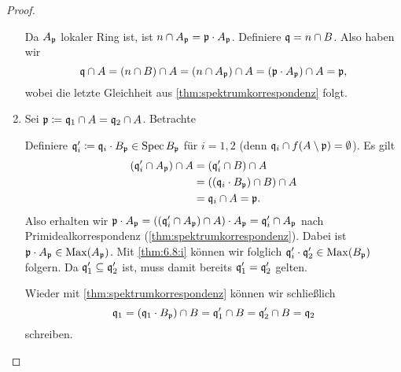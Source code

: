 \documentclass[12pt,a4paper]{scrartcl}
\theoremstyle{cplain}
\theoremstyle{cdef}
\begin{document}
\begin{proof}
\begin{enumerate}[label=\ref{thm:6.8:\roman*}]
		Da $A_{\mathfrak{p}}$ lokaler Ring ist, ist $n\cap A_{\mathfrak{p}} = \mathfrak{p}\cdot A_{\mathfrak{p}}$. Definiere $\mathfrak{q} = n\cap B$. Also haben wir 
		\[\mathfrak{q}\cap A = (n\cap B)\cap A = (n\cap A_{\mathfrak{p}})\cap A = (\mathfrak{p}\cdot A_{\mathfrak{p}})\cap A = \mathfrak{p},\]
		wobei die letzte Gleichheit aus \cref{thm:spektrumkorrespondenz} folgt.
		\item Sei $\mathfrak{p}\coloneqq \mathfrak{q}_1\cap A = \mathfrak{q}_2\cap A$. Betrachte
		\begin{center}
		\end{center}
		Definiere $\mathfrak{q}_i'\coloneqq \mathfrak{q}_i\cdot B_{\mathfrak{p}}\in \operatorname{Spec} B_{\mathfrak{p}}$ für $i = 1,2$ (denn $\mathfrak{q}_i\cap f(A\setminus \mathfrak{p}) = \emptyset$). Es gilt \begin{align*}(\mathfrak{q}_i'\cap A_{\mathfrak{p}})\cap A &= (\mathfrak{q}_i'\cap B) \cap A \\
									   &= ((\mathfrak{q}_i\cdot B_{\mathfrak{p}})\cap B)\cap A\\
									   &= \mathfrak{q}_i \cap A = \mathfrak{p}.
		\end{align*}
		Also erhalten wir $\mathfrak{p}\cdot A_{\mathfrak{p}} = ((\mathfrak{q}_i'\cap A_{\mathfrak{p}})\cap A)\cdot A_{\mathfrak{p}} = \mathfrak{q}_i'\cap A_{\mathfrak{p}}$ nach Primidealkorrespondenz (\cref{thm:spektrumkorrespondenz}).
		Dabei ist $\mathfrak{p}\cdot A_{\mathfrak{p}}\in \operatorname{Max}(A_{\mathfrak{p}})$. Mit \ref{thm:6.8:i} können wir folglich $\mathfrak{q}_i'\cdot \mathfrak{q}_2'\in \operatorname{Max}(B_{\mathfrak{p}})$ folgern. Da $\mathfrak{q}_1'\subseteq \mathfrak{q}_2'$ ist, muss damit bereits $\mathfrak{q}_1' = \mathfrak{q}_2'$ gelten.
		
		Wieder mit \cref{thm:spektrumkorrespondenz} können wir schließlich
		\[\mathfrak{q}_1 = (\mathfrak{q}_1\cdot B_{\mathfrak{p}})\cap B = \mathfrak{q}_1'\cap B = \mathfrak{q}_2'\cap B = \mathfrak{q}_2\]
		schreiben.
		\qedhere
	\end{enumerate}
\end{proof}
\end{document}
